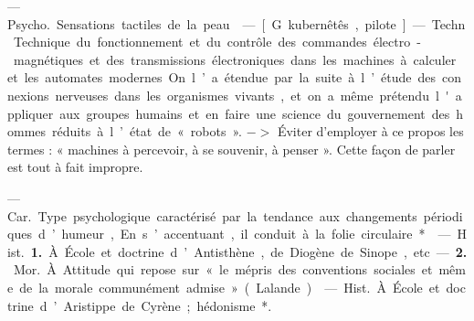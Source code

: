 \begin{itemize}[leftmargin=1cm, label=, itemsep=11pt]
 — \si{Psycho.} Sensations tactiles de la peau.

 — [G. kubernêtês, pilote] —
Techn. Technique du fonctionnement et du contrôle des commandes
électro-magnétiques et des transmissions électroniques dans les machines à calculer et les automates
modernes. On l’a étendue par la suite
à l’étude des connexions nerveuses
dans les organismes vivants, et on a
même prétendu l'appliquer aux
groupes humains et en faire une
science du gouvernement des hommes réduits à l’état de « robots ».
$->$ Éviter d'employer à ce propos
les termes : « machines à percevoir,
à se souvenir, à penser ». Cette façon
de parler est tout à fait impropre.

 — \si{Car.} Type psychologique caractérisé par la tendance
aux changements périodiques d’humeur, En s’accentuant, il conduit à
la folie circulaire*.

 — \si{Hist.} {\bf 1.} À École et doctrine d’Antisthène, de Diogène de
Sinope, etc.

—  {\bf 2.} \si{Mor.} À. Attitude qui repose
sur « le mépris des conventions sociales et même de la morale communément admise » (Lalande).

 — \si{Hist.} À. École et doctrine d’Aristippe de Cyrène; hédonisme*.

	\end{itemize}
